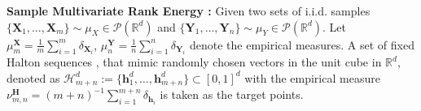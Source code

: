 \documentclass{article}
\begin{document}

\textbf{Sample Multivariate Rank Energy \cite{deb2021multivariate}:} Given two sets of i.i.d. samples {\small $\{\!\bm X_1, \dots,\bm X_m \!\}\!\sim \!\mu_{X}\!\in\! \mathcal P(\mathbb R^d)$} and {\small $\{\bm Y_1, \dots,\bm Y_n\} \sim \mu_{Y}\in \mathcal P(\mathbb R^d)$}. Let {\small $\mu^{\bm X}_m \!\!=\!\!\frac{1}{m}\sum_{i=1}^m \delta_{\bm X_i}$}, {\small $\mu^{\bm Y}_n \!\!=\!\! \frac{1}{n}\sum_{i=1}^n\delta_{\bm Y_i}$} denote the empirical measures. 
A set of fixed Halton sequences \cite{chi2005optimal}, that mimic randomly chosen vectors in the unit cube in $\mathbb{R}^d$, denoted as {\small $\mathcal H_{m+n}^d:=\{\bm h_1^d, \dots, \bm h^d_{m+n}\}\subset [0, 1]^d$} with the empirical measure {\small$ \nu_{m,n}^{\mathbf{H}} = (m + n)^{-1}\sum_{ i = 1}^{ m + n} \delta_{\bm h_i}$} is taken as the target points. %
\end{document}
